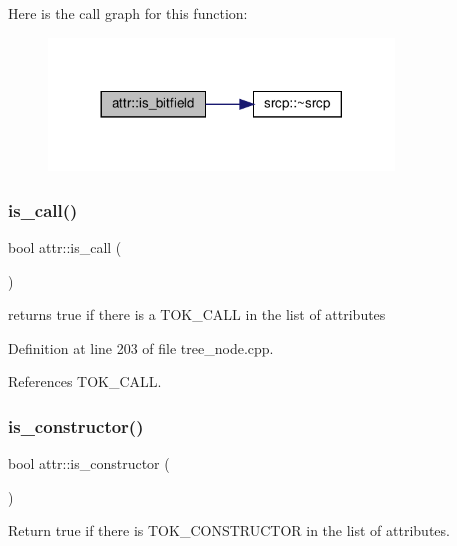 Here is the call graph for this function\+:
\nopagebreak
\begin{figure}[H]
\begin{center}
\leavevmode
\includegraphics[width=260pt]{dc/de4/structattr_a747c4d450ad4ebac8bb6c65326636d3a_cgraph}
\end{center}
\end{figure}
\mbox{\label{structattr_a7c932d5da3c3fa73a4ce6f4f1d432ca8}} 
\subsubsection{\texorpdfstring{is\+\_\+call()}{is\_call()}}
{\footnotesize\ttfamily bool attr\+::is\+\_\+call (\begin{DoxyParamCaption}{ }\end{DoxyParamCaption})}



returns true if there is a T\+O\+K\+\_\+\+C\+A\+LL in the list of attributes 



Definition at line 203 of file tree\+\_\+node.\+cpp.



References T\+O\+K\+\_\+\+C\+A\+LL.

\mbox{\label{structattr_ac69c066beb6c45ac1e0cb44d785a652a}} 
\subsubsection{\texorpdfstring{is\+\_\+constructor()}{is\_constructor()}}
{\footnotesize\ttfamily bool attr\+::is\+\_\+constructor (\begin{DoxyParamCaption}{ }\end{DoxyParamCaption})}



Return true if there is T\+O\+K\+\_\+\+C\+O\+N\+S\+T\+R\+U\+C\+T\+OR in the list of attributes. 



